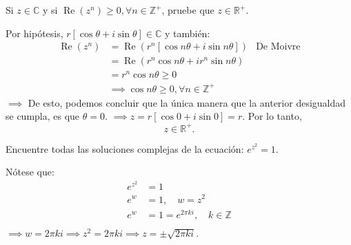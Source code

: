 \begin{problema}
    Si $z \in \mathbb{C}$ y si $\operatorname{Re}\left(z^{n}\right) \geq 0, \forall n \in \mathbb{Z}^{+}$, pruebe que $z \in \mathbb{R}^{+}$.
    \begin{sol}
        Por hipótesis, $r\left[\cos\theta + i \sin\theta\right] \in \mathbb{C}$ y también:
        \begin{align*}
            \operatorname{Re}\left(z^{n}\right) &= \operatorname{Re}\left(r^n \left[\cos n\theta + i\sin n\theta\right] \right) & \text{De Moivre}\\
            &= \operatorname{Re}\left(r^n\cos n\theta + ir^n\sin n\theta\right) & \\
            &= r^n\cos n\theta \geq 0\\
            &\implies \cos n\theta \geq 0,\forall n\in\mathbb{Z}^+
        \end{align*}
        $\implies$ De esto, podemos concluir que la única manera que la anterior desigualdad se cumpla, es que $\theta =0$. $\implies z=r\left[\cos 0 +i \sin 0\right]=r$. Por lo tanto, 
        $$z\in\mathbb{R}^+.$$
    \end{sol}
\end{problema}

\begin{problema}
    Encuentre todas las soluciones complejas de la ecuación: $e^{z^{2}}=1$.
    \begin{sol}
        Nótese que:
        \begin{align*}
            e^{z^2} &= 1\\
            e^{w} &= 1, \quad w= z^2\\
            e^{w} &= 1 = e^{2\pi k i}, \quad k\in\mathbb{Z} \\
        \end{align*}
        $\implies w = 2\pi k i \implies z^2 = 2\pi k i\implies z= \pm \sqrt{2\pi k i}$.
    \end{sol}
\end{problema}

